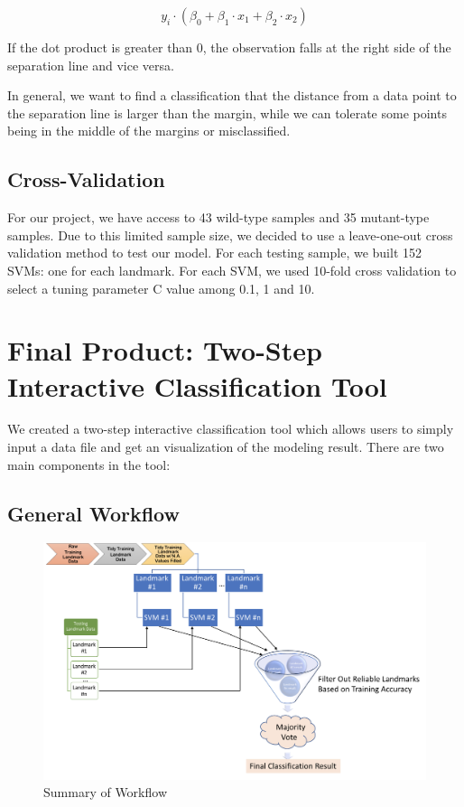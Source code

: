 \documentclass[10pt,letterpaper]{article}
\begin{document}
\[y_i \cdot ( \beta_0 + \beta_1 \cdot x_1 + \beta_2 \cdot x_2 )\]

If the dot product is greater than 0, the observation falls at the right
side of the separation line and vice versa.

In general, we want to find a classification that the distance from a
data point to the separation line is larger than the margin, while we
can tolerate some points being in the middle of the margins or
misclassified.

\subsection{Cross-Validation}\label{cross-validation}

For our project, we have access to 43 wild-type samples and 35
mutant-type samples. Due to this limited sample size, we decided to use
a leave-one-out cross validation method to test our model. For each
testing sample, we built 152 SVMs: one for each landmark. For each SVM,
we used 10-fold cross validation to select a tuning parameter C value
among 0.1, 1 and 10.

\section{Final Product: Two-Step Interactive Classification
Tool}\label{final-product-two-step-interactive-classification-tool}

We created a two-step interactive classification tool which allows users
to simply input a data file and get an visualization of the modeling
result. There are two main components in the tool:

\subsection{General Workflow}\label{general-workflow}

\begin{figure}[h]

{\centering \includegraphics{figures/Figure1} 

}

\caption{\label{workflow} Summary of Workflow}\label{fig:unnamed-chunk-4}
\end{figure}
\end{document}

